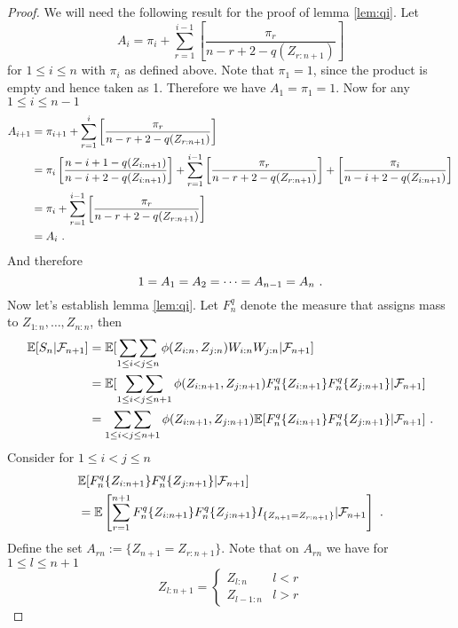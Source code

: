 \begin{proof}
We will need the following result for the proof of lemma \ref{lem:qi}. Let 
$$A_i = \pi_i + \sum\limits_{r=1}^{i-1}\left[\frac{\pi_r}{n-r+2-q(Z_{r:n+1})} \right]$$
for $1\leq i\leq n$ with $\pi_i$ as defined above. Note that $\pi_1 = 1$, since the product is empty and hence taken as 1. Therefore we have $A_1=\pi_1=1$. Now for any $1\leq i\leq n-1$ 
\begin{align*}
	A_{i+1} &= \pi_{i+1} + \sum\limits_{r=1}^i\left[\frac{\pi_r}{n-r+2-q(Z_{r:n+1})} \right]\\
	&= \pi_i \left[ \frac{n-i+1-q(Z_{i:n+1})}{n-i+2-q(Z_{i:n+1})}\right] + \sum\limits_{r=1}^{i-1}\left[\frac{\pi_r}{n-r+2-q(Z_{r:n+1})}\right] + \left[\frac{\pi_i}{n-i+2-q(Z_{i:n+1})}  \right]\\
	&= \pi_i + \sum\limits_{r=1}^{i-1}\left[\frac{\pi_r}{n-r+2-q(Z_{r:n+1})}\right]\\
	&= A_i\textrm{ .}
\end{align*}
And therefore 
\begin{equation}
	1=A_1=A_2=\dots=A_{n-1}=A_n
	\label{eq:Ai}\textrm{ .}
\end{equation}
%
Now let's establish lemma \ref{lem:qi}. Let $F_n^q$ denote the measure that assigns mass to $Z_{1:n},\dots,Z_{n:n}$, then
\begin{align*}
\mathbb{E}[S_{n}|\mathcal{F}_{n+1}] &= \mathbb{E}[\mathop{\sum\sum}\limits_{1\leq i<j\leq n} \phi(Z_{i:n},Z_{j:n}) W_{i:n}W_{j:n}|\mathcal{F}_{n+1}]\\
    &= \mathbb{E}[\mathop{\sum\sum}\limits_{1\leq i<j\leq n+1} \phi(Z_{i:n+1},Z_{j:n+1}) F_n^q\{Z_{i:n+1}\}F_n^q\{Z_{j:n+1}\}|\mathcal{F}_{n+1}]\\
		&= \mathop{\sum\sum}\limits_{1\leq i<j\leq n+1} \phi(Z_{i:n+1},Z_{j:n+1}) \mathbb{E}[F_n^q\{Z_{i:n+1}\}F_n^q\{Z_{j:n+1}\}|\mathcal{F}_{n+1}]\textrm{ .}
\end{align*}
%
Consider for $1\leq i<j\leq n$ 
\begin{align*}
& \mathbb{E}[F_n^q\{Z_{i:n+1}\}F_n^q\{Z_{j:n+1}\}|\mathcal{F}_{n+1}] \\
&=\mathbb{E}\left[\sum\limits_{r=1}^{n+1}F_n^q\{Z_{i:n+1}\}F_n^q\{Z_{j:n+1}\}I_{\{Z_{n+1}=Z_{r:n+1}\}}|\mathcal{F}_{n+1}\right]\textrm{ .}
\end{align*}
%
Define the set $A_{rn} := \{Z_{n+1}=Z_{r:n+1}\}$. Note that on $A_{rn}$ we have for $1\leq l\leq n+1$
\begin{equation}
Z_{l:n+1} = \begin{cases} 
Z_{l:n} & l<r \\
Z_{l-1:n} & l>r
\end{cases}
\label{eq:change_order_delta}

\end{equation}
\end{proof}

